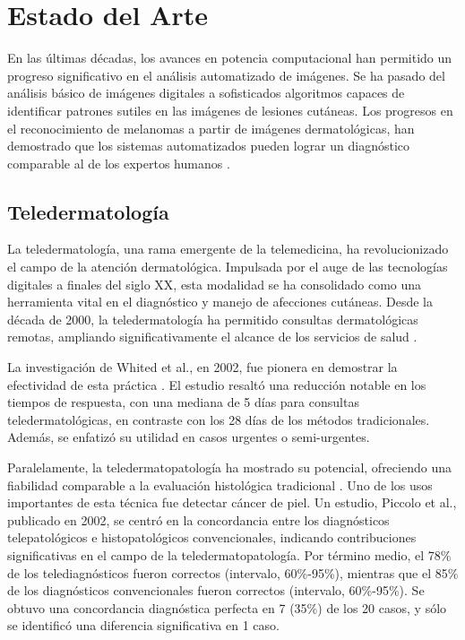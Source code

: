 \chapter{Estado del Arte}\label{chapter:state-of-the-art}

En las últimas décadas, los avances en potencia computacional han permitido un progreso significativo en el análisis automatizado de imágenes. Se ha pasado del análisis básico de imágenes digitales a sofisticados algoritmos capaces de identificar patrones sutiles en las imágenes de lesiones cutáneas. Los progresos en el reconocimiento de melanomas a partir de imágenes dermatológicas, han demostrado que los sistemas automatizados pueden lograr un diagnóstico comparable al de los expertos humanos .   

\section{Teledermatología}

La teledermatología, una rama emergente de la telemedicina, ha revolucionizado el campo de la atención dermatológica. Impulsada por el auge de las tecnologías digitales a finales del siglo XX, esta modalidad se ha consolidado como una herramienta vital en el diagnóstico y manejo de afecciones cutáneas. Desde la década de 2000, la teledermatología ha permitido consultas dermatológicas remotas, ampliando significativamente el alcance de los servicios de salud .

La investigación de Whited et al., en 2002, fue pionera en demostrar la efectividad de esta práctica . El estudio resaltó una reducción notable en los tiempos de respuesta, con una mediana de 5 días para consultas teledermatológicas, en contraste con los 28 días de los métodos tradicionales. Además, se enfatizó su utilidad en casos urgentes o semi-urgentes.

Paralelamente, la teledermatopatología ha mostrado su potencial, ofreciendo una fiabilidad comparable a la evaluación histológica tradicional . Uno de los usos importantes de esta técnica fue detectar cáncer de piel. Un estudio, Piccolo et al.,  publicado en 2002, se centró en la concordancia entre los diagnósticos telepatológicos e histopatológicos convencionales, indicando contribuciones significativas en el campo de la teledermatopatología. Por término medio, el 78\% de los telediagnósticos fueron correctos (intervalo, 60\%-95\%), mientras que el 85\% de los diagnósticos convencionales fueron correctos (intervalo, 60\%-95\%). Se obtuvo una concordancia diagnóstica perfecta en 7 (35\%) de los 20 casos, y sólo se identificó una diferencia significativa en 1 caso.

